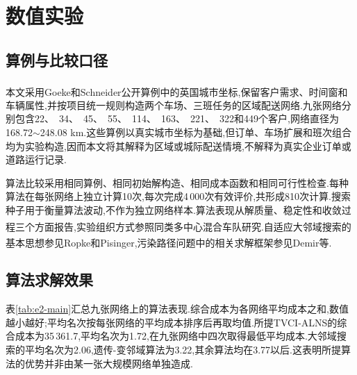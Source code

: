 \documentclass{../setp-new}
\newcommand{\setptabsetup}{\fontsize{7pt}{8.4pt}\selectfont\renewcommand{\arraystretch}{1.02}\setlength{\tabcolsep}{5pt}}
\begin{document}
\maketitle

\section{数值实验}

\subsection{算例与比较口径}

本文采用Goeke和Schneider\textsuperscript{\cite{ref1}}公开算例中的英国城市坐标,保留客户需求、时间窗和车辆属性,并按项目统一规则构造两个车场、三班任务的区域配送网络.九张网络分别包含22、~34、~45、~55、~114、~163、~221、~322和449个客户,网络直径为168.72$\sim$248.08 km.这些算例以真实城市坐标为基础,但订单、车场扩展和班次组合均为实验构造,因而本文将其解释为区域或城际配送情境,不解释为真实企业订单或道路运行记录.

算法比较采用相同算例、相同初始解构造、相同成本函数和相同可行性检查.每种算法在每张网络上独立计算10次,每次完成4\,000次有效评价,共形成810次计算.搜索种子用于衡量算法波动,不作为独立网络样本.算法表现从解质量、稳定性和收敛过程三个方面报告,实验组织方式参照同类多中心混合车队研究\textsuperscript{\cite{refchen}}.自适应大邻域搜索的基本思想参见Ropke和Pisinger\textsuperscript{\cite{ref2}},污染路径问题中的相关求解框架参见Demir等\textsuperscript{\cite{ref3}}.

\subsection{算法求解效果}

表\ref{tab:e2-main}汇总九张网络上的算法表现.综合成本为各网络平均成本之和,数值越小越好;平均名次按每张网络的平均成本排序后再取均值.所提TVCI-ALNS的综合成本为35\,361.7,平均名次为1.72,在九张网络中四次取得最低平均成本.大邻域搜索的平均名次为2.06,遗传-变邻域算法为3.22,其余算法均在3.77以后.这表明所提算法的优势并非由某一张大规模网络单独造成.

\begin{table}[H]
\centering
\caption{九张网络上的算法综合表现}
\label{tab:e2-main}
\setptabsetup

\end{table}
\end{document}

